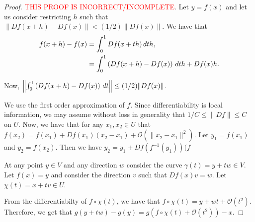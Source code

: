\begin{proof}
\textcolor{red}{THIS PROOF IS INCORRECT/INCOMPLETE}.
Let $y = f(x)$ and let us consider restricting $h$ such that $\|Df(x+h)-Df(x)\|<(1/2)\|Df(x)\|$. We have that 
\begin{align}
f(x+h) - f(x) & = \int_0^1 Df(x+ th) \, dt h,\\
&  = \int_0^1 \left(Df(x+h) - Df(x)\right)\, dt h + Df(x)h.
\end{align}

Now, $\left\|\int_0^1 \left(Df(x+h) - Df(x)\right)\, dt\right\| \leq (1/2) \|Df(x)\|$.

We use the first order approximation of $f$. Since differentiability is local information, we may assume without loss in generality that $1/C \leq \|Df\| \leq C$ on $U$. Now, we have that for any $x_1, x_2 \in U$ that $f(x_2) = f(x_1) + Df(x_1) (x_2 - x_1) + \mathcal O(\|x_2 - x_1\|^2)$. Let $y_1 = f(x_1)$ and $y_2 = f(x_2)$. Then we have $y_2 = y_1 + Df(f^{-1}(y_1)) (f$

At any point $y\in V$ and any direction $w$ consider the curve $\gamma(t) = y + tw \in V$. Let $f(x) = y$ and consider the direction $v$ such that $Df(x)v = w$. Let $\chi(t) = x + tv \in U$.

From the differentiabilty of $f\circ \chi(t)$, we have that $f\circ \chi(t)  = y + wt + \mathcal O(t^2).$ Therefore, we get that $g(y+tw) - g(y) = g(f\circ\chi(t) + \mathcal O(t^2)) - x$.
\end{proof}